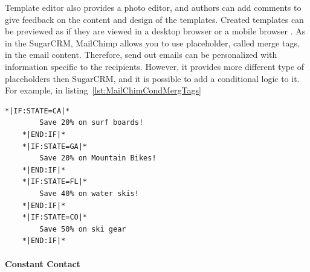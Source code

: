 Template editor also provides a photo editor, and authors can add comments to give feedback on the content and design of the templates. Created templates can be previewed as if they are viewed in a desktop browser or a mobile browser \citep{TheRocketScienceGroupLLC2013a}. As in the SugarCRM, MailChimp allows you to use placeholder, called merge tags, in the email content. Therefore, send out emails can be personalized with information specific to the recipients. However, it provides more different type of placeholders then SugarCRM, and it is possible to add a conditional logic to it. For example, in listing~\ref{lst:MailChimCondMergTags}
\vspace{1cm}


\begin{lstlisting}[language=XML, caption={[MailChimp's Conditional Merge Tags]MailChimp's Conditional Merge Tags \citep{TheRocketScienceGroupLLC2013b}}, label={lst:MailChimCondMergTags}]
	*|IF:STATE=CA|*
		Save 20% on surf boards!
	*|END:IF|* 
	*|IF:STATE=GA|*
		Save 20% on Mountain Bikes!
	*|END:IF|* 
	*|IF:STATE=FL|*
		Save 40% on water skis!
	*|END:IF|* 
	*|IF:STATE=CO|*
		Save 50% on ski gear
	*|END:IF|*
\end{lstlisting}

\paragraph{Constant Contact}

